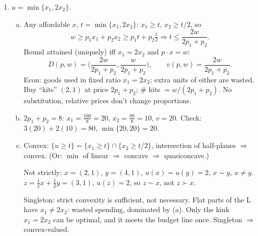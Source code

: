 \documentclass[12pt]{article}
\begin{document}
\begin{enumerate}
\begin{enumerate}[(a)]
$\lambda = 2$: $D(8,2,160) = (\tfrac{160}{16}, \tfrac{160}{4}) = (10,40) = D(4,1,80)$. \checkmark
\end{enumerate}

\item $u = \min\{x_1, 2x_2\}$.
\begin{enumerate}[(a)]
\item Any affordable $x$, $t = \min\{x_1, 2x_2\}$: $x_1 \ge t$, $x_2 \ge t/2$, so
\[
w \ge p_1 x_1 + p_2 x_2 \ge p_1 t + p_2 \tfrac{t}{2} \Rightarrow t \le \frac{2w}{2p_1 + p_2}.
\]
Bound attained (uniquely) iff $x_1 = 2x_2$ and $p \cdot x = w$:
\[
D(p,w) = \Big( \frac{2w}{2p_1+p_2}, \frac{w}{2p_1+p_2} \Big), \qquad v(p,w) = \frac{2w}{2p_1+p_2}.
\]
Econ: goods used in fixed ratio $x_1 = 2x_2$; extra units of either are wasted. Buy ``kits'' $(2,1)$ at price $2p_1 + p_2$; \# kits $= w/(2p_1+p_2)$. No substitution, relative prices don't change proportions.

\item $2p_1 + p_2 = 8$: $x_1 = \tfrac{160}{8} = 20$, $x_2 = \tfrac{80}{8} = 10$, $v = 20$. Check: $3(20)+2(10) = 80$, $\min\{20,20\} = 20$.

\item Convex: $\{u \ge t\} = \{x_1 \ge t\} \cap \{x_2 \ge t/2\}$, intersection of half-planes $\Rightarrow$ convex. (Or: $\min$ of linear $\Rightarrow$ concave $\Rightarrow$ quasiconcave.)

Not strictly: $x = (2,1)$, $y = (4,1)$, $u(x) = u(y) = 2$, $x \sim y$, $x \ne y$. $z = \tfrac12 x + \tfrac12 y = (3,1)$, $u(z) = 2$, so $z \sim x$, not $z \succ x$.

Singleton: strict convexity is sufficient, not necessary. Flat parts of the L have $x_1 \ne 2x_2$: wasted spending, dominated by (a). Only the kink $x_1 = 2x_2$ can be optimal, and it meets the budget line once. Singleton $\Rightarrow$ convex-valued.
\end{enumerate}

\end{enumerate}
\end{document}
